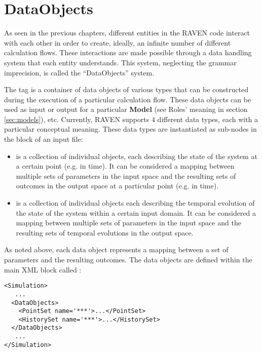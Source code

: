 \section{DataObjects}
\label{sec:DataObjects}

As seen in the previous chapters, different entities in the RAVEN
code interact with each other in order to create, ideally, an infinite number of
different calculation flows.
%
These interactions are made possible through a data handling system that each
entity understands.
%
This system, neglecting the grammar imprecision, is called the ``DataObjects''
system.

The  tag is a container of data objects of various types that can
be constructed during the execution of a particular calculation flow.
%
These data objects can be used as input or output for a particular
\textbf{Model} (see Roles' meaning in section \ref{sec:models}), etc.
%
Currently, RAVEN supports 4 different data types, each with a particular
conceptual meaning.
%
These data types are instantiated as sub-nodes in the  block of
an input file:
\begin{itemize}
  \item {} is a collection of individual objects, each
  describing the state of the system at a certain point (e.g. in time).
  It can be considered a mapping between multiple sets of parameters in the
  input space and the resulting sets of outcomes in the output space at a
  particular point (e.g. in time).
  \item {} is a collection of individual objects each
  describing the temporal evolution of the state of the system within a certain
  input domain.
  It can be considered a mapping between multiple sets of parameters in the
  input space and the resulting sets of temporal evolutions in the output
  space.
\end{itemize}

As noted above, each data object represents a mapping between a set of
parameters and the resulting outcomes.
%
The data objects are defined within the main XML block called :
\begin{lstlisting}[style=XML]
<Simulation>
   ...
  <DataObjects>
    <PointSet name='***'>...</PointSet>
    <HistorySet name='***'>...</HistorySet>
  </DataObjects>
   ...
</Simulation>
\end{lstlisting}

